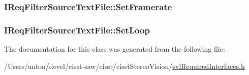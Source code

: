 \subsubsection[{Set\+Framerate}]{ I\+Req\+Filter\+Source\+Text\+File\+::\+Set\+Framerate}\label{class_i_req_filter_source_text_file_ab2f583e13bb4f0e6019fd749a43efbc7}
\hypertarget{class_i_req_filter_source_text_file_a2790141d7cbbd3ff46682e50a558ad6e}{}
\subsubsection[{Set\+Loop}]{ I\+Req\+Filter\+Source\+Text\+File\+::\+Set\+Loop}\label{class_i_req_filter_source_text_file_a2790141d7cbbd3ff46682e50a558ad6e}


The documentation for this class was generated from the following file\+:\begin{DoxyCompactItemize}
\item 
/\+Users/anton/devel/cisst-\/saw/cisst/cisst\+Stereo\+Vision/\hyperlink{svl_required_interfaces_8h}{svl\+Required\+Interfaces.\+h}\end{DoxyCompactItemize}
